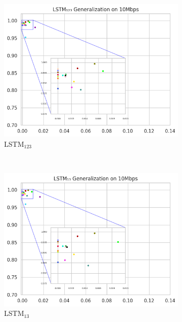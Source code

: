 \documentclass[a4paper,fleqn]{cas-sc}
\begin{document}
\begin{figure}[h!]
\begin{minipage}[t]{0.46\textwidth}
			\begin{subfigure}[t]{0.33\textwidth}
				\includegraphics[draft=false, width=\textwidth]{./figs/Generalizacao-LSTM123-10Mbps.png} 
				\caption{LSTM$_{123}$}
				\label{fig:Generalizacao-LSTM123-10Mbps}
			\end{subfigure}%
			~
			\begin{subfigure}[t]{0.33\textwidth}
				\includegraphics[draft=false, width=\textwidth]{./figs/Generalizacao-LSTM13-10Mbps.png} 
				\caption{LSTM$_{13}$}
				\label{fig:Generalizacao-LSTM13-10Mbps}
			\end{subfigure}%
			~
			\begin{subfigure}[t]{0.33\textwidth}

\end{subfigure}
\end{minipage}
\end{figure}
\end{document}
